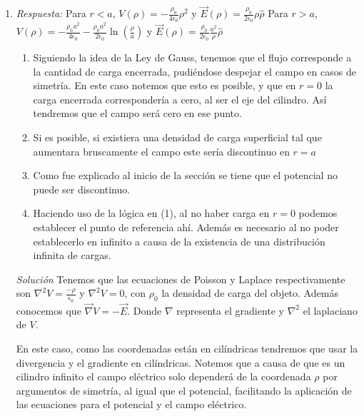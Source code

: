 \bigbreak
{}
\begin{enumerate}[label=\alph*)]
    \item \textit{Respuesta:} \newline Para $r < a$, $V(\rho) = -\frac{\rho_0}{4\epsilon_0}\rho^2$ y $\vec{E}(\rho) = \frac{\rho_0}{2\epsilon_0}\rho\hat{\rho}$
    \newline Para $r > a$, $V(\rho) = -\frac{\rho_0a^2}{4\epsilon_0} -\frac{\rho_0a^2}{2\epsilon_0}\ln\left(\frac{\rho}{a}\right)$ y $\vec{E}(\rho) = \frac{\rho_0}{2\epsilon_0}\frac{a^2}{\rho}\hat{\rho}$ 
    
    \begin{enumerate}[label=\arabic*)]
        \item Siguiendo la idea de la Ley de Gauss, tenemos que el flujo corresponde a la cantidad de carga encerrada, pudiéndose despejar el campo en casos de simetría. En este caso notemos que esto es posible, y que en $r=0$ la carga encerrada correspondería a cero, al ser el eje del cilindro. Así tendremos que el campo será cero en ese punto.
        \item Si es posible, si existiera una densidad de carga superficial tal que aumentara bruscamente el campo este sería discontinuo en $r=a$
        \item Como fue explicado al inicio de la sección se tiene que el potencial no puede ser discontinuo. 
        \item Haciendo uso de la lógica en (1), al no haber carga en $r=0$ podemos establecer el punto de referencia ahí. Además es necesario al no poder establecerlo en infinito a causa de la existencia de una distribución infinita de cargas.
    \end{enumerate}
    \bigbreak
    \textit{Solución} \newline
    Tenemos que las ecuaciones de Poisson y Laplace respectivamente son $\nabla^2V = \frac{-\rho}{\epsilon_0}$ y $\nabla^2V = 0$, con $\rho_0$ la densidad de carga del objeto. Además conocemos que $\Vec{\nabla}V = -\Vec{E}$. Donde $\nabla$ representa el gradiente y $\nabla^2$ el laplaciano de $V$.
    
    En este caso, como las coordenadas están en cilíndricas tendremos que usar la divergencia y el gradiente en cilíndricas. Notemos que a causa de que es un cilindro infinito el campo eléctrico solo dependerá de la coordenada $\rho$ por argumentos de simetría, al igual que el potencial, facilitando la aplicación de las ecuaciones para el potencial y el campo eléctrico. 
    

\end{enumerate}
